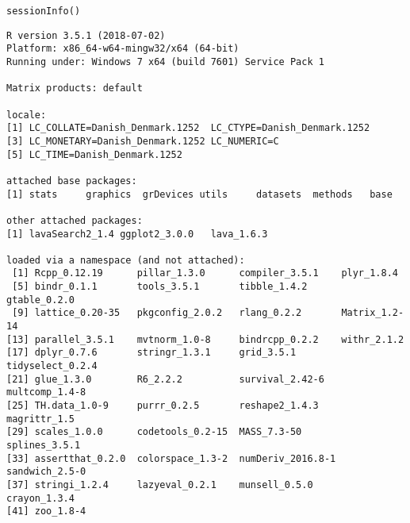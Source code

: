 \documentclass[12pt]{article}
\begin{document}
\lstset{language=r,label= ,caption= ,captionpos=b,numbers=none}
\begin{lstlisting}
sessionInfo()
\end{lstlisting}

\begin{verbatim}
R version 3.5.1 (2018-07-02)
Platform: x86_64-w64-mingw32/x64 (64-bit)
Running under: Windows 7 x64 (build 7601) Service Pack 1

Matrix products: default

locale:
[1] LC_COLLATE=Danish_Denmark.1252  LC_CTYPE=Danish_Denmark.1252   
[3] LC_MONETARY=Danish_Denmark.1252 LC_NUMERIC=C                   
[5] LC_TIME=Danish_Denmark.1252    

attached base packages:
[1] stats     graphics  grDevices utils     datasets  methods   base     

other attached packages:
[1] lavaSearch2_1.4 ggplot2_3.0.0   lava_1.6.3     

loaded via a namespace (and not attached):
 [1] Rcpp_0.12.19      pillar_1.3.0      compiler_3.5.1    plyr_1.8.4       
 [5] bindr_0.1.1       tools_3.5.1       tibble_1.4.2      gtable_0.2.0     
 [9] lattice_0.20-35   pkgconfig_2.0.2   rlang_0.2.2       Matrix_1.2-14    
[13] parallel_3.5.1    mvtnorm_1.0-8     bindrcpp_0.2.2    withr_2.1.2      
[17] dplyr_0.7.6       stringr_1.3.1     grid_3.5.1        tidyselect_0.2.4 
[21] glue_1.3.0        R6_2.2.2          survival_2.42-6   multcomp_1.4-8   
[25] TH.data_1.0-9     purrr_0.2.5       reshape2_1.4.3    magrittr_1.5     
[29] scales_1.0.0      codetools_0.2-15  MASS_7.3-50       splines_3.5.1    
[33] assertthat_0.2.0  colorspace_1.3-2  numDeriv_2016.8-1 sandwich_2.5-0   
[37] stringi_1.2.4     lazyeval_0.2.1    munsell_0.5.0     crayon_1.3.4     
[41] zoo_1.8-4
\end{verbatim}
\end{document}
